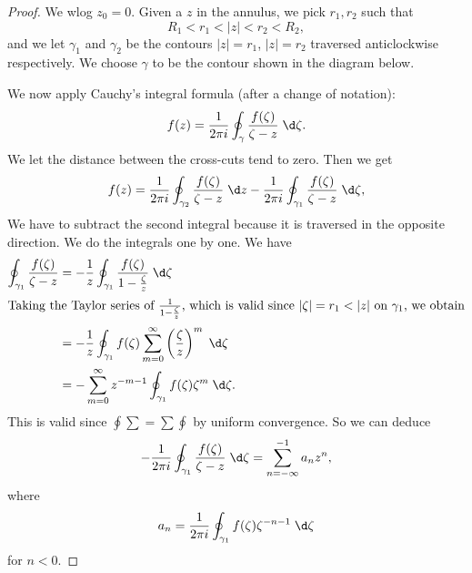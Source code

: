 \documentclass[a4paper]{article}
\begin{document}
\begin{proof}
  We wlog $z_0 = 0$. Given a $z$ in the annulus, we pick $r_1, r_2$ such that
  \[
    R_1 < r_1 < |z| < r_2 < R_2,
  \]
  and we let $\gamma_1$ and $\gamma_2$ be the contours $|z| = r_1$, $|z| = r_2$ traversed anticlockwise respectively. We choose $\gamma$ to be the contour shown in the diagram below.
  \begin{center}
  \end{center}
  We now apply Cauchy's integral formula (after a change of notation):
  \[
    f(z) = \frac{1}{2\pi i} \oint_\gamma \frac{f(\zeta)}{\zeta - z} \;\d \zeta.
  \]
  We let the distance between the cross-cuts tend to zero. Then we get
  \[
    f(z) = \frac{1}{2\pi i} \oint_{\gamma_2} \frac{f(\zeta)}{\zeta - z}\;\d z - \frac{1}{2\pi i} \oint_{\gamma_1} \frac{f(\zeta)}{\zeta - z}\;\d \zeta,
  \]
  We have to subtract the second integral because it is traversed in the opposite direction. We do the integrals one by one. We have
  \begin{align*}
    \oint_{\gamma_1} \frac{f(\zeta)}{\zeta - z} &= -\frac{1}{z} \oint_{\gamma_1} \frac{f(\zeta)}{1 - \frac{\zeta}{z}}\;\d \zeta\\
    \intertext{Taking the Taylor series of $\frac{1}{1 - \frac{\zeta}{z}}$, which is valid since $|\zeta| = r_1 < |z|$ on $\gamma_1$, we obtain}
    &= -\frac{1}{z}\oint_{\gamma_1} f(\zeta) \sum_{m = 0}^\infty \left(\frac{\zeta}{z}\right)^m \;\d \zeta\\
    &= -\sum_{m = 0}^\infty z^{-m - 1} \oint_{\gamma_1}f(\zeta) \zeta^m \;\d \zeta.
  \end{align*}
  This is valid since $\oint \sum = \sum \oint$ by uniform convergence. So we can deduce
  \[
    -\frac{1}{2\pi i} \oint_{\gamma_1} \frac{f(\zeta)}{\zeta - z}\;\d \zeta = \sum_{n = -\infty}^{-1} a_n z^n,
  \]
  where
  \[
    a_n = \frac{1}{2\pi i}\oint_{\gamma_1} f(\zeta) \zeta^{-n - 1} \;\d \zeta
  \]
  for $n < 0$.


\end{proof}
\end{document}
